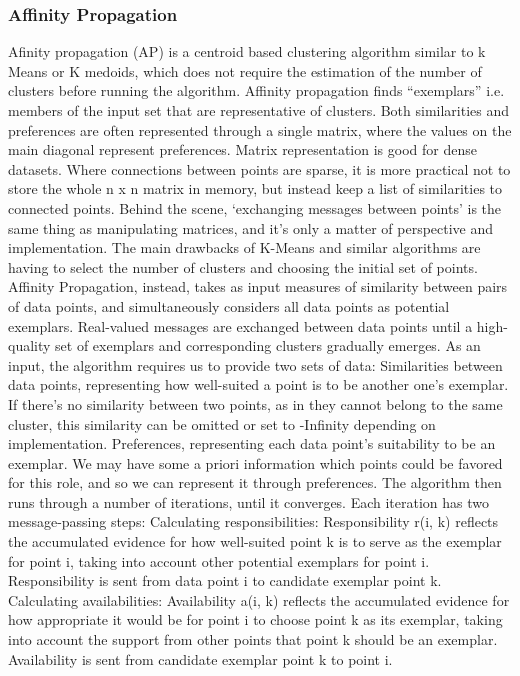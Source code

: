 \documentclass[a4paper, 12pt]{article}
\begin{document}
\subsubsection{Affinity Propagation}
Afinity propagation (AP) is a centroid based clustering algorithm similar to k Means or K medoids, which does not require the estimation of the number of clusters before running the algorithm. Affinity propagation finds “exemplars” i.e. members of the input set that are representative of clusters.
Both similarities and preferences are often represented through a single matrix, where the values on the main diagonal represent preferences. Matrix representation is good for dense datasets. Where connections between points are sparse, it is more practical not to store the whole n x n matrix in memory, but instead keep a list of similarities to connected points. Behind the scene, ‘exchanging messages between points’ is the same thing as manipulating matrices, and it’s only a matter of perspective and implementation.
The main drawbacks of K-Means and similar algorithms are having to select the number of clusters and choosing the initial set of points. Affinity Propagation, instead, takes as input measures of similarity between pairs of data points, and simultaneously considers all data points as potential exemplars. Real-valued messages are exchanged between data points until a high-quality set of exemplars and corresponding clusters gradually emerges.
As an input, the algorithm requires us to provide two sets of data:
    Similarities between data points, representing how well-suited a point is to be another one’s exemplar. If there’s no similarity between two points, as in they cannot belong to the same cluster, this similarity can be omitted or set to -Infinity depending on implementation.
    Preferences, representing each data point’s suitability to be an exemplar. We may have some a priori information which points could be favored for this role, and so we can represent it through preferences.
The algorithm then runs through a number of iterations, until it converges. Each iteration has two message-passing steps:
    Calculating responsibilities: Responsibility r(i, k) reflects the accumulated evidence for how well-suited point k is to serve as the exemplar for point i, taking into account other potential exemplars for point i. Responsibility is sent from data point i to candidate exemplar point k.
    Calculating availabilities: Availability a(i, k) reflects the accumulated evidence for how appropriate it would be for point i to choose point k as its exemplar, taking into account the support from other points that point k should be an exemplar. Availability is sent from candidate exemplar point k to point i.
\end{document}
